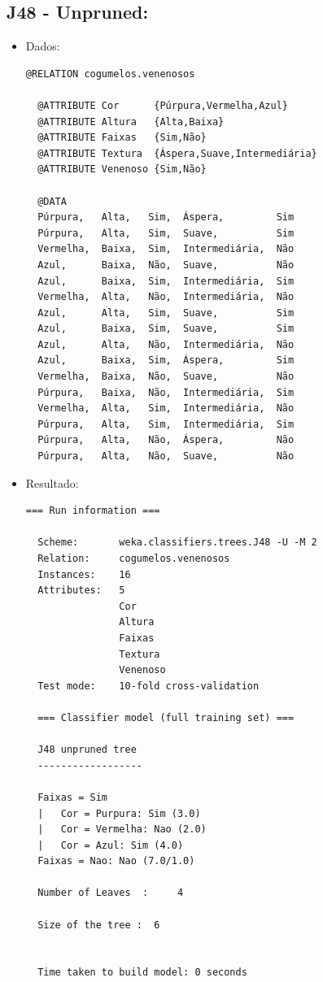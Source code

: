 \documentclass[
    article,            %
    11pt,               %
    oneside,            %
    a4paper,            %
    english,            %
    brazil,             %
    sumario=tradicional,
    ]{abntex2}
\begin{document}
\subsection{\textbf{J48 - Unpruned:}}
\begin{itemize}
  \item Dados:
  \begin{Verbatim}[frame=single, fontsize=\tiny]
  @RELATION cogumelos.venenosos

  @ATTRIBUTE Cor      {Púrpura,Vermelha,Azul}
  @ATTRIBUTE Altura   {Alta,Baixa}
  @ATTRIBUTE Faixas   {Sim,Não}
  @ATTRIBUTE Textura  {Áspera,Suave,Intermediária}
  @ATTRIBUTE Venenoso {Sim,Não}

  @DATA
  Púrpura,   Alta,   Sim,  Áspera,         Sim
  Púrpura,   Alta,   Sim,  Suave,          Sim
  Vermelha,  Baixa,  Sim,  Intermediária,  Não
  Azul,      Baixa,  Não,  Suave,          Não
  Azul,      Baixa,  Sim,  Intermediária,  Sim
  Vermelha,  Alta,   Não,  Intermediária,  Não
  Azul,      Alta,   Sim,  Suave,          Sim
  Azul,      Baixa,  Sim,  Suave,          Sim
  Azul,      Alta,   Não,  Intermediária,  Não
  Azul,      Baixa,  Sim,  Áspera,         Sim
  Vermelha,  Baixa,  Não,  Suave,          Não
  Púrpura,   Baixa,  Não,  Intermediária,  Sim
  Vermelha,  Alta,   Sim,  Intermediária,  Não
  Púrpura,   Alta,   Sim,  Intermediária,  Sim
  Púrpura,   Alta,   Não,  Áspera,         Não
  Púrpura,   Alta,   Não,  Suave,          Não
  \end{Verbatim}

  \item Resultado:
  \begin{Verbatim}[frame=single, fontsize=\tiny]
  === Run information ===

  Scheme:       weka.classifiers.trees.J48 -U -M 2
  Relation:     cogumelos.venenosos
  Instances:    16
  Attributes:   5
                Cor
                Altura
                Faixas
                Textura
                Venenoso
  Test mode:    10-fold cross-validation

  === Classifier model (full training set) ===

  J48 unpruned tree
  ------------------

  Faixas = Sim
  |   Cor = Purpura: Sim (3.0)
  |   Cor = Vermelha: Nao (2.0)
  |   Cor = Azul: Sim (4.0)
  Faixas = Nao: Nao (7.0/1.0)

  Number of Leaves  :     4

  Size of the tree :  6


  Time taken to build model: 0 seconds


\end{Verbatim}
\end{itemize}
\end{document}
